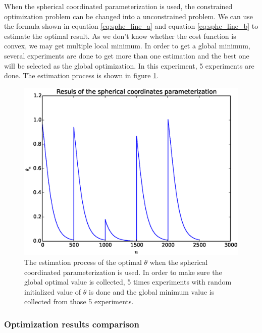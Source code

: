 \documentclass[a4paper,12pt]{article}
\begin{document}
When the spherical coordinated parameterization is used, the constrained optimization problem can be changed into a unconstrained problem. We can use the formula shown in equation \ref{eq:sphe_line_a} and equation \ref{eq:sphe_line_b} to estimate the optimal result. As we don't know whether the cost function is convex, we may get multiple local minimum. In order to get a global minimum, several experiments are done to get more than one estimation and the best one will be selected as the global optimization. In this experiment, 5 experiments are done. The estimation process is  shown in figure \ref{fig:line_result_sphe}.\\
\begin{figure}[H]
\begin{center}
\includegraphics[width=1.0\linewidth]{line_est_sphe.eps}


\end{center}
   \caption{The estimation process of the optimal $\theta$ when the spherical coordinated parameterization is used. In order to make sure the global optimal value is collected, 5 times experiments with random initialized value of $\theta$ is done and the global minimum value is collected from those 5 experiments.}
\label{fig:line_result_sphe}
\end{figure}

\subsubsection{Optimization results comparison}
\end{document}
